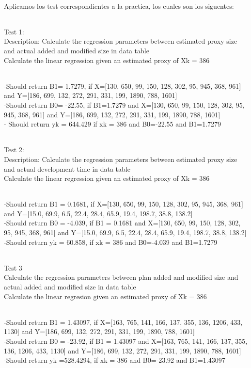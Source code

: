 \documentclass{article}
\begin{document}
{\\Aplicamos los test correspondientes a la practica, los cuales son los siguentes:}
{\\Test 1:\\
Description: Calculate the regression parameters between estimated proxy size and actual added and modified size in data table
\\Calculate the linear regression given an estimated proxy of Xk = 386

\\-Should return B1= 1.7279, if X=[130, 650, 99, 150, 128, 302, 95, 945, 368, 961] and Y=[186, 699, 132, 272, 291, 331, 199, 1890, 788, 1601]
\\-Should return B0= -22.55, if B1=1.7279 and X=[130, 650, 99, 150, 128, 302, 95, 945, 368, 961] and Y=[186, 699, 132, 272, 291, 331, 199, 1890, 788, 1601]
\\- Should return yk = 644.429 if xk = 386 and B0=-22.55 and B1=1.7279

\\Test 2:\\
Description: Calculate the regression parameters between estimated proxy size and actual development time in data table
\\Calculate the linear regression given an estimated proxy of Xk = 386

\\-Should return B1 = 0.1681, if X=[130, 650, 99, 150, 128, 302, 95, 945, 368, 961] and Y=[15.0, 69.9, 6.5, 22.4, 28.4, 65.9, 19.4, 198.7, 38.8, 138.2]
\\-Should return  B0 = -4.039, if B1 = 0.1681 and X=[130, 650, 99, 150, 128, 302, 95, 945, 368, 961] and Y=[15.0, 69.9, 6.5, 22.4, 28.4, 65.9, 19.4, 198.7, 38.8, 138.2]
\\-Should return yk = 60.858, if xk = 386 and B0=-4.039 and B1=1.7279

\\Test 3\\ 
Calculate the regression parameters between plan added and modified size and actual added and modified size in data table
\\Calculate the linear regresion given an estimated proxy of Xk = 386

\\-Should return B1 = 1.43097, if X=[163, 765, 141, 166, 137, 355, 136, 1206, 433, 1130] and Y=[186, 699, 132, 272, 291, 331, 199, 1890, 788, 1601]
\\-Should return B0 = -23.92, if B1 = 1.43097 and X=[163, 765, 141, 166, 137, 355, 136, 1206, 433, 1130] and Y=[186, 699, 132, 272, 291, 331, 199, 1890, 788, 1601]
\\-Should return yk =528.4294, if xk = 386 and B0=-23.92 and B1=1.43097

}
\end{document}
